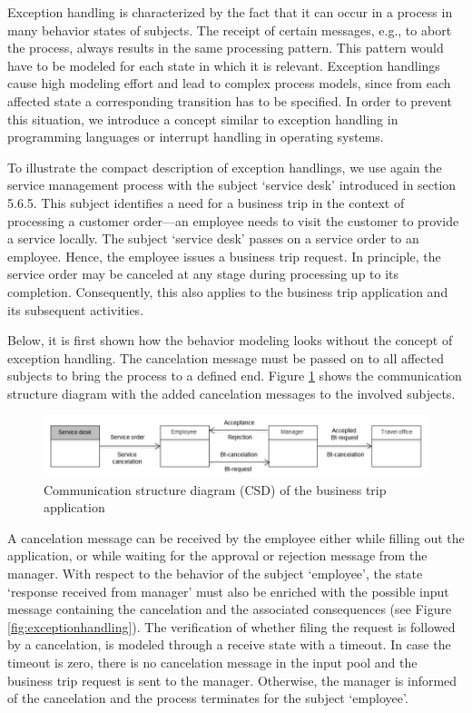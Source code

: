 Exception handling is characterized by the fact that it can occur in a process in many behavior states of subjects. The receipt of certain messages, e.g., to abort the process, always results in the same processing pattern. This pattern would have to be modeled for each state in which it is relevant. Exception handlings cause high modeling effort and lead to complex process models, since from each affected state a corresponding transition has to be specified. In order to prevent this situation, we introduce a concept similar to exception handling in programming languages or interrupt handling in operating systems.

To illustrate the compact description of exception handlings, we use again the service management process with the subject ‘service desk’ introduced in section 5.6.5. This subject identifies a need for a business trip in the context of processing a customer order—an employee needs to visit the customer to provide a service locally. The subject ‘service desk’ passes on a service order to an employee. Hence, the employee issues a business trip request. In principle, the service order may be canceled at any stage during processing up to its completion. Consequently, this also applies to the business trip application and its subsequent activities.

Below, it is first shown how the behavior modeling looks without the concept of exception handling. The cancelation message must be passed on to all affected subjects to bring the process to a defined end. Figure \ref{fig:sid-exception} shows the communication structure diagram with the added cancelation messages to the involved subjects.

\begin{figure}[ph!]
	\centering
	\includegraphics[width=0.7\linewidth]{20181026-Ontologie-Bilder/Grafiken-Ontologie/SUbjectExecution/SID-Exception}
	\caption[Communication structure diagram (CSD) of the business trip application]{Communication structure diagram (CSD) of the business trip application}
	\label{fig:sid-exception}
\end{figure}


A cancelation message can be received by the employee either while filling out the application, or while waiting for the approval or rejection message from the manager. With respect to the behavior of the subject ‘employee’, the state ‘response received from manager’ must also be enriched with the possible input message containing the cancelation and the associated consequences (see Figure \ref{fig:exceptionhandling}). The verification of whether filing the request is followed by a cancelation, is modeled through a receive state with a timeout. In case the timeout is zero, there is no cancelation message in the input pool and the business trip request is sent to the manager. Otherwise, the manager is informed of the cancelation and the process terminates for the subject ‘employee’.


